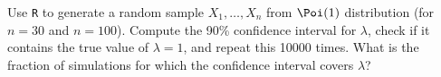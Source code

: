 
\begin{exercise}

Use \texttt{R} to generate a random sample $X_1,\dots,X_n$ from $\Poi(1)$
distribution (for $n = 30$ and $n = 100$).
Compute the 90\% confidence interval for $\lambda$, check if it contains
the true value of $\lambda = 1$, and repeat this 10000 times. What is the
fraction of simulations for which the confidence interval covers $\lambda$?
\end{exercise}


\begin{solution}

\phantom{}

\end{solution}

